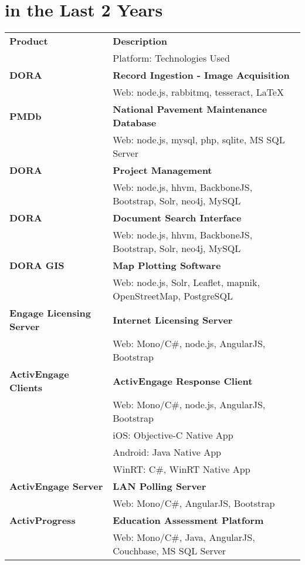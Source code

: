 \section{ in the Last 2 Years}
\noindent \begin{tabular}{ p{4cm} p{10.5cm} }
\textbf{Product} & \textbf{Description}\\
 & Platform: Technologies Used \\
\midrule
\textbf{DORA} & \textbf{Record Ingestion - Image Acquisition}\\
 & Web: node.js, rabbitmq, tesseract, LaTeX\\
\midrule
\textbf{PMDb} & \textbf{National Pavement Maintenance Database}\\
 & Web: node.js, mysql, php, sqlite, MS SQL Server\\
\midrule
\textbf{DORA} & \textbf{Project Management}\\
 & Web: node.js, hhvm, BackboneJS, Bootstrap, Solr, neo4j, MySQL\\
\midrule
\textbf{DORA} & \textbf{Document Search Interface}\\
 & Web: node.js, hhvm, BackboneJS, Bootstrap, Solr, neo4j, MySQL\\
\midrule
\textbf{DORA GIS} & \textbf{Map Plotting Software}\\
 & Web: node.js, Solr, Leaflet, mapnik, OpenStreetMap, PostgreSQL\\
\midrule
\textbf{Engage Licensing Server} & \textbf{Internet Licensing Server} \\
 & Web: Mono/C\#, node.js, AngularJS, Bootstrap\\
\midrule
\textbf{ActivEngage Clients} & \textbf{ActivEngage Response Client}\\
 & Web: Mono/C\#, node.js, AngularJS, Bootstrap\\
 & iOS: Objective-C Native App\\
 & Android: Java Native App\\
 & WinRT: C\#, WinRT Native App\\
\midrule
\textbf{ActivEngage Server} & \textbf{LAN Polling Server}\\
 & Web: Mono/C\#, AngularJS, Bootstrap\\
\midrule
\textbf{ActivProgress} & \textbf{Education Assessment Platform}\\
 & Web: Mono/C\#, Java, AngularJS, Couchbase, MS SQL Server\\

\end{tabular}

